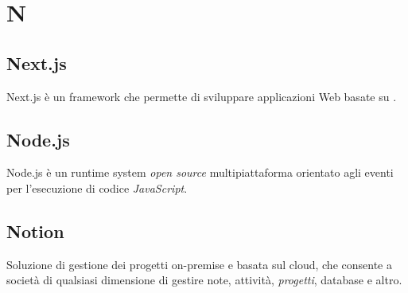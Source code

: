 \chapter{N}

\section{Next.js}
Next.js è un framework che permette di sviluppare applicazioni Web basate su .

\section{Node.js}
Node.js è un runtime system \emph{open source} multipiattaforma orientato agli eventi per l'esecuzione di codice \emph{JavaScript}.

\section{Notion}
Soluzione di gestione dei progetti on-premise e basata sul cloud, che consente a società di qualsiasi dimensione di gestire note, attività, \emph{progetti}, database e altro.


